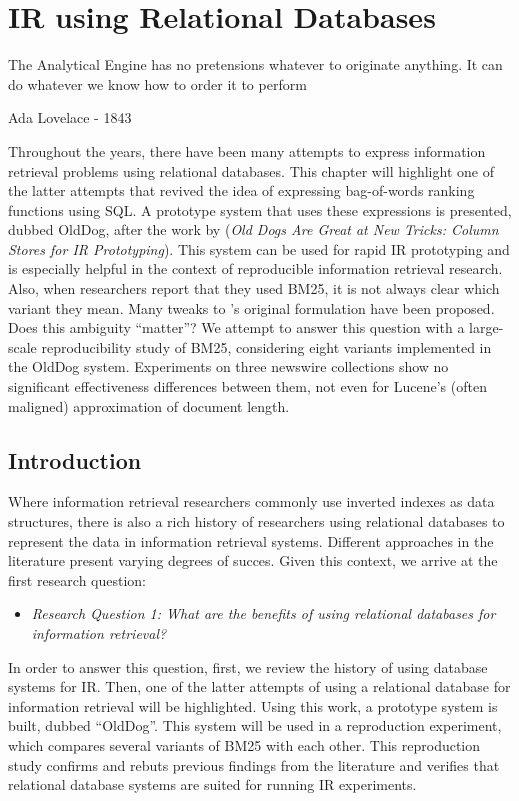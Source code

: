 \chapter{IR using Relational Databases}
\label{ir-using-relational-databases}
\epigraph{The Analytical Engine has no pretensions whatever to originate anything. It can do whatever we know how to order it to perform}{Ada Lovelace - 1843}

\begin{Abstract}
	\begin{changemargin}{1cm}{1cm}
		Throughout the years, there have been many attempts to express information retrieval problems using relational databases. This chapter will highlight one of the latter attempts that revived the idea of expressing bag-of-words ranking functions using SQL. A prototype system that uses these expressions is presented, dubbed OldDog, after the work by \citeauthor{OldDog} (\emph{Old Dogs Are Great at New Tricks: Column Stores for IR Prototyping}). This system can be used for rapid IR prototyping and is especially helpful in the context of reproducible information retrieval research. Also, when researchers report that they used BM25, it is not always clear which variant they mean. Many tweaks to \citeauthor{bm25-robertson}'s original formulation have been proposed. Does this ambiguity ``matter''? We attempt to answer this question with a large-scale reproducibility study of BM25, considering eight variants implemented in the OldDog system. Experiments on three newswire collections show no significant effectiveness differences between them, not even for Lucene's (often maligned) approximation of document length.
	\end{changemargin}
\end{Abstract}

\section{Introduction}
Where information retrieval researchers commonly use inverted indexes as data structures, there is also a rich history of researchers using relational databases to represent the data in information retrieval systems. Different approaches in the literature present varying degrees of succes. Given this context, we arrive at the first research question: 
\begin{itemize}  
	\item \emph{Research Question 1: What are the benefits of using relational databases for information retrieval?} 
\end{itemize}
In order to answer this question, first, we review the history of using database systems for IR. Then, one of the latter attempts of using a relational database for information retrieval will be highlighted. Using this work, a prototype system is built, dubbed ``OldDog''. This system will be used in a reproduction experiment, which compares several variants of BM25 with each other. This reproduction study confirms and rebuts previous findings from the literature and verifies that relational database systems are suited for running IR experiments. 

